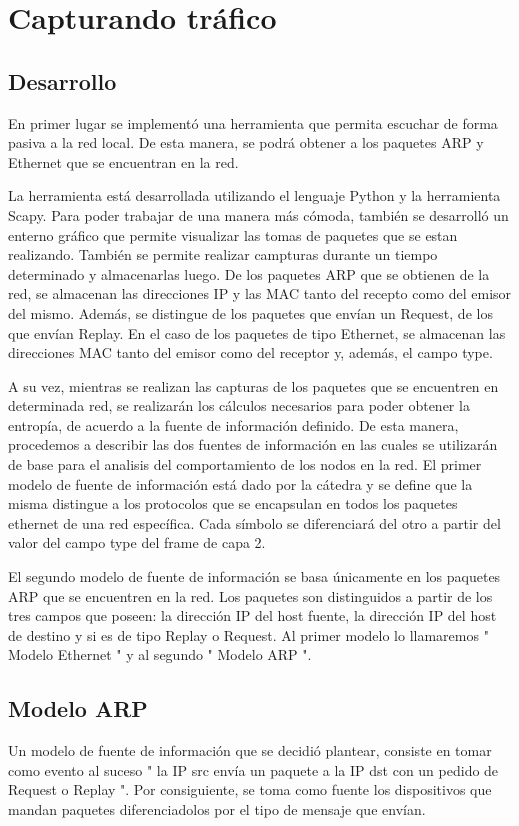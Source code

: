 \section{Capturando tráfico}

\subsection{Desarrollo}

En primer lugar se implementó una herramienta que permita escuchar de forma pasiva a la red local. De esta manera, se podrá obtener a los paquetes ARP y Ethernet que se encuentran en la red. 

La herramienta está desarrollada utilizando el lenguaje Python y la herramienta Scapy. Para poder trabajar de una manera más cómoda, también se desarrolló un enterno gráfico que permite visualizar las tomas de paquetes que se estan realizando. También se permite realizar campturas durante un tiempo determinado y almacenarlas luego.  
De los paquetes ARP que se obtienen de la red, se almacenan las direcciones IP y las MAC tanto del recepto como del emisor del mismo. Además, se distingue de los paquetes que envían un Request, de los que envían Replay. En el caso de los paquetes de tipo Ethernet, se almacenan las direcciones MAC tanto del emisor como del receptor y, además, el campo type.

A su vez, mientras se realizan las capturas de los paquetes que se encuentren en determinada red, se realizarán los cálculos necesarios para poder obtener la entropía, de acuerdo a la fuente de información definido. De esta manera, procedemos a describir las dos fuentes de información en las cuales se utilizarán de base para el analisis del comportamiento de los nodos en la red. 
El primer modelo de fuente de información está dado por la cátedra y se define que la misma distingue a los protocolos que se encapsulan en todos los paquetes ethernet de una red específica. Cada símbolo se diferenciará del otro a partir del valor del campo type del frame de capa 2.

El segundo modelo de fuente de información se basa únicamente en los paquetes ARP que se encuentren en la red. Los paquetes son distinguidos a partir de los tres campos que poseen: la dirección IP del host fuente, la dirección IP del host de destino y si es de tipo Replay o Request. 
Al primer modelo lo llamaremos " Modelo Ethernet " y al segundo " Modelo ARP ".


\subsection{Modelo ARP}
Un modelo de fuente de información que se decidió plantear, consiste en tomar como evento al suceso " la IP src envía un paquete a la IP dst con un pedido de Request o Replay ". Por consiguiente, se toma como fuente los dispositivos que mandan paquetes diferenciadolos por el tipo de mensaje que envían.

